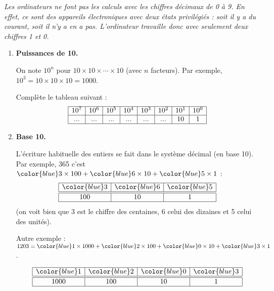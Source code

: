 \documentclass[class=report,crop=false, 12pt]{standalone}
\begin{document}

\emph{Les ordinateurs ne font pas les calculs avec les chiffres décimaux de 0 à 9. En effet, ce sont des appareils électroniques avec deux états privilégiés : soit il y a du courant, soit il n'y a en a pas. L'ordinateur travaille donc avec seulement deux chiffres 1 et 0.}

\bigskip
\bigskip

\begin{activite}
\sauteligne
\begin{enumerate}
  \item \textbf{Puissances de 10.}

    On note $10^n$ pour $10 \times 10 \times \cdots \times 10$ (avec $n$ facteurs). Par exemple, $10^3 = 10 \times 10 \times 10 = 1000$. 

    Complète le tableau suivant :
$$
\begin{array}{|c|c|c|c|c|c|c|c|}
  \hline
  10^7  & 10^6 & 10^5 & 10^4 & 10^3 & 10^2 & 10^1 & 10^0 \\
  \hline
  ... & ... & ... & ... & ... & ... & 10 & 1 \\ 
  \hline
\end{array}
$$
  
  \item \textbf{Base 10.}

    L'écriture habituelle des entiers se fait dans le système décimal (en base 10). Par exemple, 365 c'est ${\color{blue}3} \times 100 + {\color{blue}6} \times 10 + {\color{blue}5} \times 1$ : 
$$
\begin{array}{|c|c|c|}
  \hline
  {\color{blue}3} & {\color{blue}6} & {\color{blue}5} \\ 
  \hline\hline
  100 & 10 & 1 \\
  \hline
\end{array}
$$   
(on voit bien que 3 est le chiffre des centaines, 6 celui des dizaines et 5 celui des unités). 



    

    Autre exemple :
    $1203 = {\color{blue}1} \times 1000 + {\color{blue}2} \times 100 + {\color{blue}0} \times 10 + {\color{blue}3} \times 1$.

$$
\begin{array}{|c|c|c|c|}
  \hline
  {\color{blue}1} & {\color{blue}2} & {\color{blue}0} & {\color{blue}3} \\ 
  \hline\hline
  1000 & 100 & 10 & 1 \\
  \hline
\end{array}
$$


\end{enumerate}
\end{activite}
\end{document}
